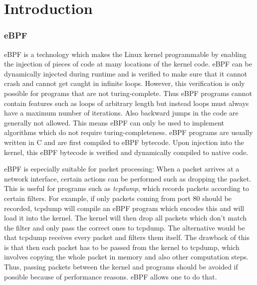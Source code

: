 \documentclass[conference]{IEEEtran}
\begin{document}

\maketitle

\section{Introduction}

\subsubsection{eBPF}

eBPF \cite{noauthor_ebpf_2020} is a technology which makes the Linux kernel programmable by enabling the injection of pieces of code at many locations of the kernel code. eBPF can be dynamically injected during runtime and is verified to make sure that it cannot crash and cannot get caught in infinite loops. However, this verification is only possible for programs that are not turing-complete. Thus eBPF programs cannot contain features such as loops of arbitrary length but instead loops must always have a maximum number of iterations. Also backward jumps in the code are generally not allowed. This means eBPF can only be used to implement algorithms which do not require turing-completeness. eBPF programs are usually written in C and are first compiled to eBPF bytecode. Upon injection into the kernel, this eBPF bytecode is verified and dynamically compiled to native code. 

eBPF is especially suitable for packet processing: When a packet arrives at a network interface, certain actions can be performed such as dropping the packet. This is useful for programs such as \textit{tcpdump}, which records packets according to certain filters. For example, if only packets coming from port 80 should be recorded, tcpdump will compile an eBPF program which encodes this and will load it into the kernel. The kernel will then drop all packets which don't match the filter and only pass the correct ones to tcpdump. The alternative would be that tcpdump receives every packet and filters them itself. The drawback of this is that then each packet has to be passed from the kernel to tcpdump, which involves copying the whole packet in memory and also other computation steps. Thus, passing packets between the kernel and programs should be avoided if possible because of performance reasons. eBPF allows one to do that. 
\end{document}
